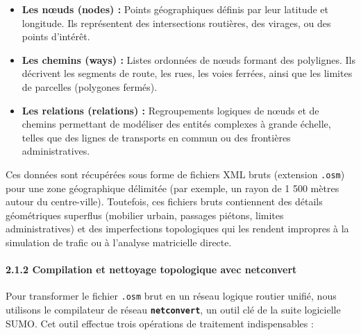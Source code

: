 \documentclass[10pt, a4paper]{article}
\providecommand{\tightlist}{}
\begin{document}
\begin{itemize}
\tightlist
\item
  \textbf{Les nœuds (nodes) :} Points géographiques définis par leur
  latitude et longitude. Ils représentent des intersections routières,
  des virages, ou des points d'intérêt.
\item
  \textbf{Les chemins (ways) :} Listes ordonnées de nœuds formant des
  polylignes. Ils décrivent les segments de route, les rues, les voies
  ferrées, ainsi que les limites de parcelles (polygones fermés).
\item
  \textbf{Les relations (relations) :} Regroupements logiques de nœuds
  et de chemins permettant de modéliser des entités complexes à grande
  échelle, telles que des lignes de transports en commun ou des
  frontières administratives.
\end{itemize}

Ces données sont récupérées sous forme de fichiers XML bruts (extension
\texttt{.osm}) pour une zone géographique délimitée (par exemple, un
rayon de 1 500 mètres autour du centre-ville). Toutefois, ces fichiers
bruts contiennent des détails géométriques superflus (mobilier urbain,
passages piétons, limites administratives) et des imperfections
topologiques qui les rendent impropres à la simulation de trafic ou à
l'analyse matricielle directe.

\paragraph{2.1.2 Compilation et nettoyage topologique avec
netconvert}\label{compilation-et-nettoyage-topologique-avec-netconvert}

Pour transformer le fichier \texttt{.osm} brut en un réseau logique
routier unifié, nous utilisons le compilateur de réseau
\textbf{\texttt{netconvert}}, un outil clé de la suite logicielle SUMO.
Cet outil effectue trois opérations de traitement indispensables :
\end{document}
